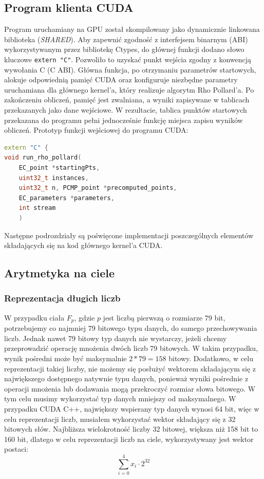 \subsection{Program klienta CUDA}

Program uruchamiany na GPU został skompilowany jako dynamicznie linkowana
biblioteka (\textit{SHARED}). Aby zapewnić zgodność z interfejsem binarnym
(ABI) wykorzystywanym przez bibliotekę Ctypes, do głównej funkcji dodano
słowo kluczowe \texttt{extern "C"}.
Pozwoliło to uzyskać punkt wejścia zgodny
z konwencją wywołania C (C ABI). Główna funkcja, po otrzymaniu parametrów
startowych, alokuje odpowiednią pamięć CUDA oraz konfiguruje niezbędne
parametry uruchamiana dla głównego kernel'a, który realizuje algorytm
Rho Pollard'a. Po zakończeniu obliczeń, pamięć jest zwalniana, a wyniki
zapisywane w tablicach przekazanych jako dane wejściowe. W rezultacie,
tablica punktów startowych przekazana do programu pełni jednocześnie
funkcję miejsca zapisu wyników obliczeń.
Prototyp funkcji wejściowej do programu CUDA:
\begin{lstlisting}[language=C++]
extern "C" {
void run_rho_pollard(
    EC_point *startingPts,
    uint32_t instances,
    uint32_t n, PCMP_point *precomputed_points,
    EC_parameters *parameters,
    int stream
    )
\end{lstlisting}
Następne podrozdziały są poświęcone implementacji poszczególnych
elementów składających się na kod głównego kernel'a CUDA.


\subsection{Arytmetyka na ciele}
\subsubsection{Reprezentacja długich liczb}
W przypadku ciała $F_{p}$, gdzie $p$ jest liczbą pierwszą o rozmiarze 79 bit, potrzebujemy co najmniej 79 bitowego typu danych, do samego przechowywania liczb.
Jednak nawet 79 bitowy typ danych nie wystarczy, jeżeli chcemy przeprowadzić operację mnożenia
dwóch liczb 79 bitowych. W takim przypadku, wynik pośredni może być maksymalnie $2*79 = 158$ bitowy.
Dodatkowo, w celu reprezentacji takiej liczby, nie możemy się posłużyć wektorem składającym się z największego
dostępnego natywnie typu danych,
ponieważ wyniki pośrednie z operacji mnożenia lub dodawania mogą przekroczyć rozmiar słowa bitowego.
W tym celu musimy wykorzystać typ danych mniejszy od maksymalnego. W przypadku CUDA C++, największy wspierany typ danych
wynosi 64 bit, więc w celu reprezentacji liczb, musiałem wykorzystać wektor składający się z 32 bitowych słów.
Najbliższa wielokrotność liczby 32 bitowej, większa niż 158 bit to 160 bit,
dlatego w celu reprezentacji liczb na ciele, wykorzystywany jest wektor postaci:
$$
    \sum_{i = 0}^{4} x_i\cdot 2^{32}
$$


